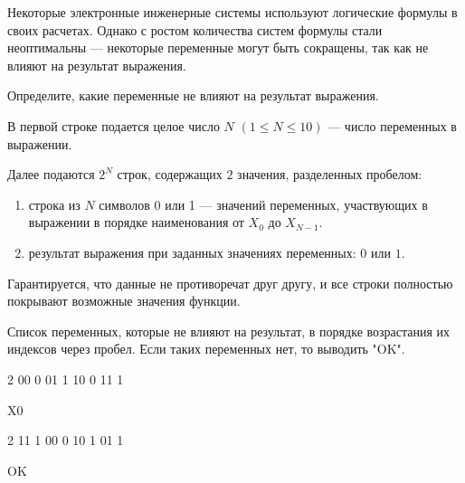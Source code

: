
Некоторые электронные инженерные системы используют логические формулы в своих расчетах. Однако с ростом количества систем формулы стали неоптимальны — некоторые переменные могут быть сокращены, так как не влияют на результат выражения.

Определите, какие переменные не влияют на результат выражения.


В первой строке подается целое число $N$ $(1 \leq N \leq 10)$ — число переменных в выражении.

Далее подаются $2^N$ строк, содержащих $2$ значения, разделенных пробелом:
\begin{enumerate}
    \item строка из $N$ символов 0 или 1 — значений переменных, участвующих в выражении в порядке наименования от $X_0$ до $X_{N-1}$.
    \item результат выражения при заданных значениях переменных: $0$ или $1$.
\end{enumerate}

Гарантируется, что данные не противоречат друг другу, и все строки полностью покрывают возможные значения функции.

\outputfmtSection

Список переменных, которые не влияют на результат, в порядке возрастания их индексов через пробел. Если таких переменных нет, то выводить "OK".


\begin{myverbbox}[\small]{\vinput}
    2
    00 0
    01 1
    10 0
    11 1
\end{myverbbox}
\begin{myverbbox}[\small]{\voutput}
    X0
\end{myverbbox}


\begin{myverbbox}[\small]{\vinput}
    2
    11 1
    00 0
    10 1
    01 1
\end{myverbbox}
\begin{myverbbox}[\small]{\voutput}
    OK
\end{myverbbox}

